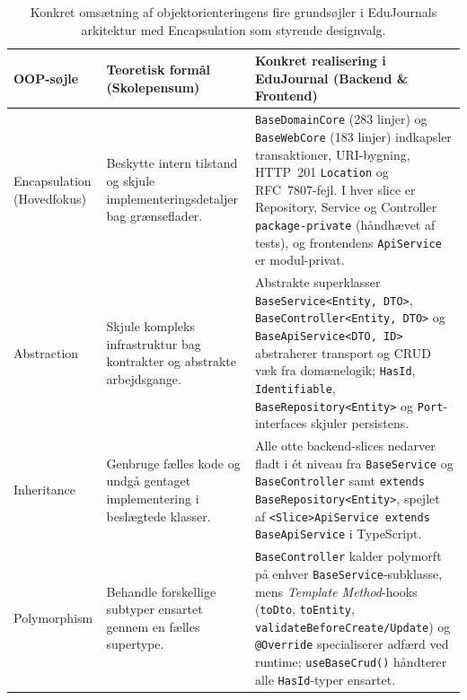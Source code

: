 \documentclass[11pt,a4paper]{article}
\begin{document}
\begin{table}[H]
\centering
\small
\begin{tabularx}{\textwidth}{P{3.0cm} P{4.2cm} Y}
\toprule
\textbf{OOP-søjle} & \textbf{Teoretisk formål (Skolepensum)} & \textbf{Konkret realisering i EduJournal (Backend \& Frontend)} \\
\midrule
Encapsulation (Hovedfokus) & Beskytte intern tilstand og skjule implementeringsdetaljer bag grænseflader. & \texttt{BaseDomainCore} (283 linjer) og \texttt{BaseWebCore} (183 linjer) indkapsler transaktioner, URI-bygning, HTTP~201 \texttt{Location} og RFC~7807-fejl. I hver slice er Repository, Service og Controller \texttt{package-private} (håndhævet af tests), og frontendens \texttt{ApiService} er modul-privat. \\
\midrule
Abstraction & Skjule kompleks infrastruktur bag kontrakter og abstrakte arbejdsgange. & Abstrakte superklasser \texttt{BaseService<Entity, DTO>}, \texttt{BaseController<Entity, DTO>} og \texttt{BaseApiService<DTO, ID>} abstraherer transport og CRUD væk fra domænelogik; \texttt{HasId}, \texttt{Identifiable}, \texttt{BaseRepository<Entity>} og \texttt{Port}-interfaces skjuler persistens. \\
\midrule
Inheritance & Genbruge fælles kode og undgå gentaget implementering i beslægtede klasser. & Alle otte backend-slices nedarver fladt i ét niveau fra \texttt{BaseService} og \texttt{BaseController} samt \texttt{extends BaseRepository<Entity>}, spejlet af \texttt{<Slice>ApiService extends BaseApiService} i TypeScript. \\
\midrule
Polymorphism & Behandle forskellige subtyper ensartet gennem en fælles supertype. & \texttt{BaseController} kalder polymorft på enhver \texttt{BaseService}-subklasse, mens \textit{Template Method}-hooks (\texttt{toDto}, \texttt{toEntity}, \texttt{validateBeforeCreate/Update}) og \texttt{@Override} specialiserer adfærd ved runtime; \texttt{useBaseCrud()} håndterer alle \texttt{HasId}-typer ensartet. \\
\bottomrule
\end{tabularx}
\caption{Konkret omsætning af objektorienteringens fire grundsøjler i EduJournals arkitektur med Encapsulation som styrende designvalg.}
\label{tab:oop_pillars}
\end{table}
\end{document}
